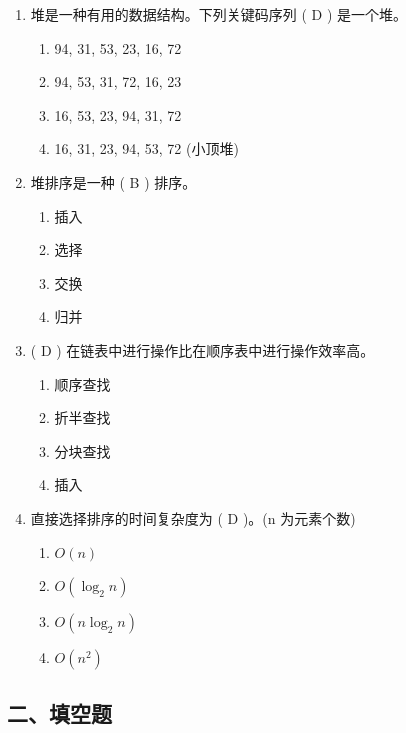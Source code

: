 \documentclass[12pt, a4paper]{article}
\begin{document}
\begin{enumerate}[label=\arabic*.]
    \item 堆是一种有用的数据结构。下列关键码序列 ( D ) 是一个堆。
    \begin{enumerate}
        \item 94, 31, 53, 23, 16, 72
        \item 94, 53, 31, 72, 16, 23
        \item 16, 53, 23, 94, 31, 72
        \item 16, 31, 23, 94, 53, 72 (小顶堆)
    \end{enumerate}

    \item 堆排序是一种 ( B ) 排序。
    \begin{enumerate}
        \item 插入
        \item 选择
        \item 交换
        \item 归并
    \end{enumerate}

    \item ( D ) 在链表中进行操作比在顺序表中进行操作效率高。
    \begin{enumerate}
        \item 顺序查找
        \item 折半查找
        \item 分块查找
        \item 插入
    \end{enumerate}

    \item 直接选择排序的时间复杂度为 ( D )。(n 为元素个数)
    \begin{enumerate}
        \item $O(n)$
        \item $O(\log_2 n)$
        \item $O(n \log_2 n)$
        \item $O(n^2)$
    \end{enumerate}
\end{enumerate}

\subsection*{二、填空题}
\end{document}
